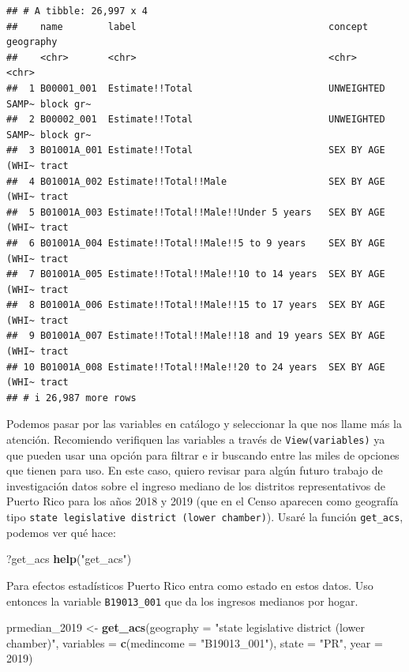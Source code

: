 \documentclass[
]{article}
\newenvironment{Shaded}{\begin{snugshade}}{\end{snugshade}}
\newcommand{\AttributeTok}[1]{\textcolor[rgb]{0.13,0.29,0.53}{#1}}
\newcommand{\DecValTok}[1]{\textcolor[rgb]{0.00,0.00,0.81}{#1}}
\newcommand{\FunctionTok}[1]{\textcolor[rgb]{0.13,0.29,0.53}{\textbf{#1}}}
\newcommand{\NormalTok}[1]{#1}
\newcommand{\OtherTok}[1]{\textcolor[rgb]{0.56,0.35,0.01}{#1}}
\newcommand{\StringTok}[1]{\textcolor[rgb]{0.31,0.60,0.02}{#1}}
\begin{document}
\begin{verbatim}
## # A tibble: 26,997 x 4
##    name        label                                  concept          geography
##    <chr>       <chr>                                  <chr>            <chr>    
##  1 B00001_001  Estimate!!Total                        UNWEIGHTED SAMP~ block gr~
##  2 B00002_001  Estimate!!Total                        UNWEIGHTED SAMP~ block gr~
##  3 B01001A_001 Estimate!!Total                        SEX BY AGE (WHI~ tract    
##  4 B01001A_002 Estimate!!Total!!Male                  SEX BY AGE (WHI~ tract    
##  5 B01001A_003 Estimate!!Total!!Male!!Under 5 years   SEX BY AGE (WHI~ tract    
##  6 B01001A_004 Estimate!!Total!!Male!!5 to 9 years    SEX BY AGE (WHI~ tract    
##  7 B01001A_005 Estimate!!Total!!Male!!10 to 14 years  SEX BY AGE (WHI~ tract    
##  8 B01001A_006 Estimate!!Total!!Male!!15 to 17 years  SEX BY AGE (WHI~ tract    
##  9 B01001A_007 Estimate!!Total!!Male!!18 and 19 years SEX BY AGE (WHI~ tract    
## 10 B01001A_008 Estimate!!Total!!Male!!20 to 24 years  SEX BY AGE (WHI~ tract    
## # i 26,987 more rows
\end{verbatim}

Podemos pasar por las variables en catálogo y seleccionar la que nos
llame más la atención. Recomiendo verifiquen las variables a través de
\texttt{View(variables)} ya que pueden usar una opción para filtrar e ir
buscando entre las miles de opciones que tienen para uso. En este caso,
quiero revisar para algún futuro trabajo de investigación datos sobre el
ingreso mediano de los distritos representativos de Puerto Rico para los
años 2018 y 2019 (que en el Censo aparecen como geografía tipo
\texttt{state\ legislative\ district\ (lower\ chamber)}). Usaré la
función \texttt{get\_acs}, podemos ver qué hace:

\begin{Shaded}
\begin{Highlighting}[]
\NormalTok{?get\_acs}
\FunctionTok{help}\NormalTok{(}\StringTok{"get\_acs"}\NormalTok{)}
\end{Highlighting}
\end{Shaded}

Para efectos estadísticos Puerto Rico entra como estado en estos datos.
Uso entonces la variable \texttt{B19013\_001} que da los ingresos
medianos por hogar.

\begin{Shaded}
\begin{Highlighting}[]
\NormalTok{prmedian\_2019 }\OtherTok{\textless{}{-}} \FunctionTok{get\_acs}\NormalTok{(}\AttributeTok{geography =} \StringTok{"state legislative district (lower chamber)"}\NormalTok{, }
              \AttributeTok{variables =} \FunctionTok{c}\NormalTok{(}\AttributeTok{medincome =} \StringTok{"B19013\_001"}\NormalTok{), }
              \AttributeTok{state =} \StringTok{"PR"}\NormalTok{, }
              \AttributeTok{year =} \DecValTok{2019}\NormalTok{)}
\end{Highlighting}
\end{Shaded}
\end{document}
